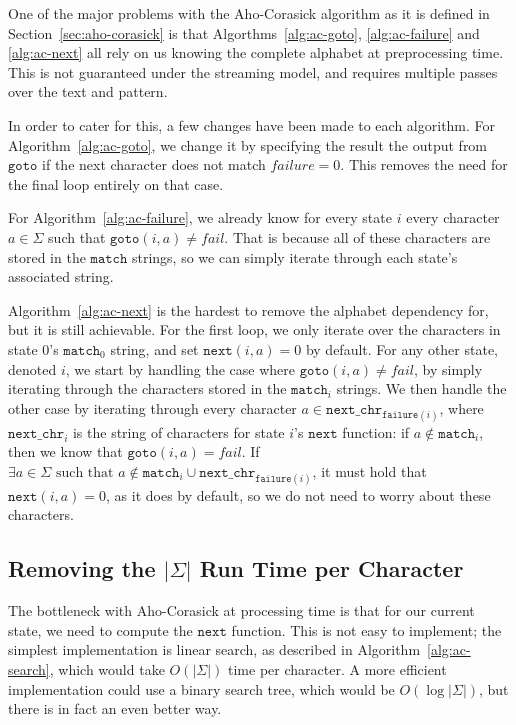 \documentclass[ %
                    author={Dominic Joseph Moylett},
                    degree={MEng},
                     title={Dictionary Matching with Fingerprints},
                  subtitle={An Empirical Analysis},
                      type={Research},
                      year={2014} ]{dissertation}
\begin{document}
One of the major problems with the Aho-Corasick algorithm as it is defined in Section~\ref{sec:aho-corasick} is that Algorthms~\ref{alg:ac-goto}, \ref{alg:ac-failure} and \ref{alg:ac-next} all rely on us knowing the complete alphabet at preprocessing time. This is not guaranteed under the streaming model, and requires multiple passes over the text and pattern.

In order to cater for this, a few changes have been made to each algorithm. For Algorithm~\ref{alg:ac-goto}, we change it by specifying the result the output from $\texttt{goto}$ if the next character does not match $failure = 0$. This removes the need for the final loop entirely on that case.

For Algorithm~\ref{alg:ac-failure}, we already know for every state $i$ every character $a \in \Sigma$ such that $\texttt{goto}(i, a) \neq fail$. That is because all of these characters are stored in the $\texttt{match}$ strings, so we can simply iterate through each state's associated string.

Algorithm~\ref{alg:ac-next} is the hardest to remove the alphabet dependency for, but it is still achievable. For the first loop, we only iterate over the characters in state 0's $\texttt{match}_{0}$ string, and set $\texttt{next}(i, a) = 0$ by default. For any other state, denoted $i$, we start by handling the case where $\texttt{goto}(i, a) \neq fail$, by simply iterating through the characters stored in the $\texttt{match}_i$ strings. We then handle the other case by iterating through every character $a \in \texttt{next\_chr}_{\texttt{failure}(i)}$, where $\texttt{next\_chr}_i$ is the string of characters for state $i$'s $\texttt{next}$ function: if $a \notin \texttt{match}_i$, then we know that $\texttt{goto}(i, a) = fail$. If $\exists a \in \Sigma \text{ such that } a \notin \texttt{match}_i \cup \texttt{next\_chr}_{\texttt{failure}(i)}$, it must hold that $\texttt{next}(i, a) = 0$, as it does by default, so we do not need to worry about these characters.

\subsection{Removing the $|\Sigma|$ Run Time per Character}

The bottleneck with Aho-Corasick at processing time is that for our current state, we need to compute the $\texttt{next}$ function. This is not easy to implement; the simplest implementation is linear search, as described in Algorithm~\ref{alg:ac-search}, which would take $O(|\Sigma|)$ time per character. A more efficient implementation could use a binary search tree, which would be $O(\log|\Sigma|)$, but there is in fact an even better way.
\end{document}
